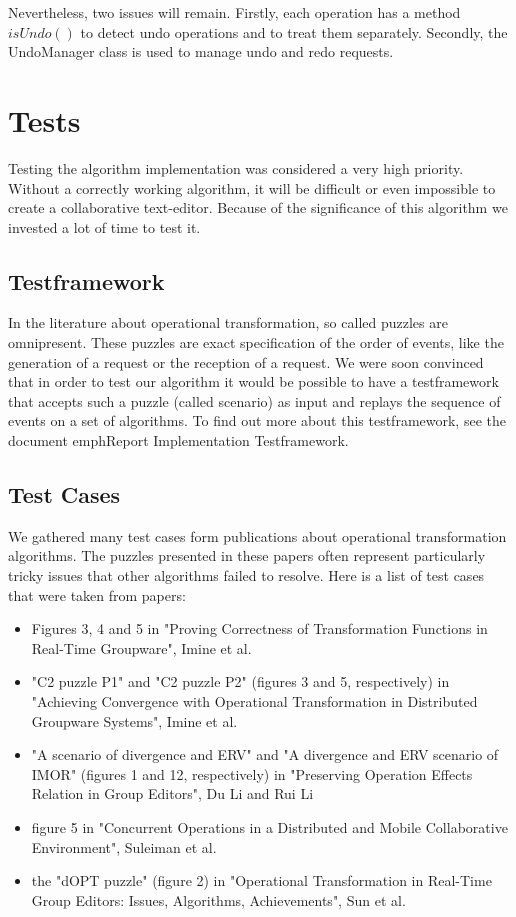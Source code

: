 Nevertheless, two issues will remain. Firstly, each operation has a method $isUndo()$ to detect undo operations and to treat them separately. Secondly, the UndoManager class is used to manage undo and redo requests.

\section{Tests}
Testing the algorithm implementation was considered a very high priority. Without a correctly working algorithm, it will be difficult or even impossible to create a collaborative text-editor. Because of the significance of this algorithm we invested a lot of time to test it.

\subsection{Testframework}
In the literature about operational transformation, so called puzzles are omnipresent. These puzzles are exact specification of the order of events, like the generation of a request or the reception of a request. We were soon convinced that in order to test our algorithm it would be possible to have a testframework that accepts such a puzzle (called scenario) as input and replays the sequence of events on a set of algorithms. To find out more about this testframework, see the document emph{Report Implementation Testframework}.

\subsection{Test Cases}
We gathered many test cases form publications about operational transformation algorithms. The puzzles presented in these papers often represent particularly tricky issues that other algorithms failed to resolve. Here is a list of test cases that were taken from papers:

\begin{itemize}
 \item Figures 3, 4 and 5 in "Proving Correctness of Transformation Functions in Real-Time Groupware", Imine et al.
 \item "C2 puzzle P1" and "C2 puzzle P2" (figures 3 and 5, respectively) in "Achieving Convergence with Operational Transformation in Distributed Groupware Systems", Imine et al.
 \item "A scenario of divergence and ERV" and  "A divergence and ERV scenario of IMOR" (figures 1 and 12, respectively) in "Preserving Operation Effects Relation in Group Editors", Du Li and Rui Li
 \item figure 5 in "Concurrent Operations in a Distributed and Mobile Collaborative Environment", Suleiman et al.
 \item the "dOPT puzzle" (figure 2) in "Operational Transformation in Real-Time Group Editors: Issues, Algorithms, Achievements", Sun et al. 
\end{itemize}

